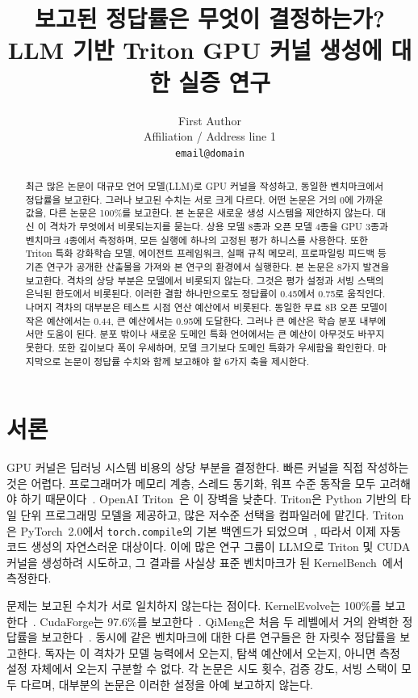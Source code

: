 \documentclass[11pt]{article}
\title{보고된 정답률은 무엇이 결정하는가? \\ LLM 기반 Triton GPU 커널 생성에 대한 실증 연구}
\author{First Author \\
  Affiliation / Address line 1 \\
  \texttt{email@domain} \\}
\begin{document}
\maketitle
\begin{abstract}
최근 많은 논문이 대규모 언어 모델(LLM)로 GPU 커널을 작성하고, 동일한 벤치마크에서 정답률을
보고한다. 그러나 보고된 수치는 서로 크게 다르다.
어떤 논문은 거의 0에 가까운 값을, 다른 논문은 100\%를 보고한다.
본 논문은 새로운 생성 시스템을 제안하지 않는다. 대신 이 격차가 무엇에서 비롯되는지를 묻는다.
상용 모델 8종과 오픈 모델 4종을 GPU 3종과 벤치마크 4종에서 측정하며,
모든 실행에 하나의 고정된 평가 하니스를 사용한다. 또한 Triton 특화 강화학습 모델,
에이전트 프레임워크, 실패 규칙 메모리, 프로파일링 피드백 등 기존 연구가 공개한 산출물을
가져와 본 연구의 환경에서 실행한다.
본 논문은 8가지 발견을 보고한다. 격차의 상당 부분은 모델에서 비롯되지 않는다.
그것은 평가 설정과 서빙 스택의 은닉된 한도에서 비롯된다. 이러한 결함 하나만으로도
정답률이 0.45에서 0.75로 움직인다. 나머지 격차의 대부분은 테스트 시점 연산 예산에서
비롯된다. 동일한 무료 8B 오픈 모델이 작은 예산에서는 0.44, 큰 예산에서는 0.95에 도달한다.
그러나 큰 예산은 학습 분포 내부에서만 도움이 된다. 분포 밖이나 새로운 도메인 특화 언어에서는
큰 예산이 아무것도 바꾸지 못한다. 또한 깊이보다 폭이 우세하며, 모델 크기보다 도메인 특화가
우세함을 확인한다. 마지막으로 논문이 정답률 수치와 함께 보고해야 할 6가지 축을 제시한다.
\end{abstract}

\section{서론}\label{sec:introduction}

GPU 커널은 딥러닝 시스템 비용의 상당 부분을 결정한다. 빠른 커널을 직접 작성하는 것은 어렵다.
프로그래머가 메모리 계층, 스레드 동기화, 워프 수준 동작을 모두 고려해야 하기
때문이다~\citep{kirk2016programming}. OpenAI Triton~\citep{tillet2019triton}은 이 장벽을 낮춘다.
Triton은 Python 기반의 타일 단위 프로그래밍 모델을 제공하고, 많은 저수준 선택을 컴파일러에
맡긴다. Triton은 PyTorch~2.0에서 \texttt{torch.compile}의 기본 백엔드가
되었으며~\citep{ansel2024pytorch2}, 따라서 이제 자동 코드 생성의 자연스러운 대상이다.
이에 많은 연구 그룹이 LLM으로 Triton 및 CUDA 커널을 생성하려 시도하고, 그 결과를 사실상 표준
벤치마크가 된 KernelBench~\citep{ouyang2024kernelbench}에서 측정한다.

문제는 보고된 수치가 서로 일치하지 않는다는 점이다. KernelEvolve는 100\%를
보고한다~\citep{liao2026kernelevolve}. CudaForge는 97.6\%를 보고한다~\citep{cudaforge2025}. QiMeng은
처음 두 레벨에서 거의 완벽한 정답률을 보고한다~\citep{qimengkernel2026}. 동시에 같은 벤치마크에
대한 다른 연구들은 한 자릿수 정답률을 보고한다. 독자는 이 격차가 모델 능력에서 오는지, 탐색
예산에서 오는지, 아니면 측정 설정 자체에서 오는지 구분할 수 없다.
각 논문은 시도 횟수, 검증 강도, 서빙 스택이 모두 다르며, 대부분의 논문은 이러한 설정을 아예
보고하지 않는다.
\end{document}
